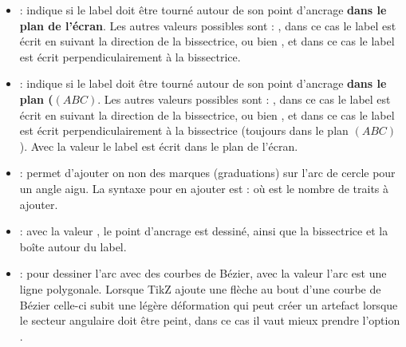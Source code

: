 \begin{itemize}
    \item {} : indique si le label doit être tourné autour de son point d'ancrage \textbf{dans le plan de l'écran}. Les autres valeurs possibles sont : , dans ce cas le label est écrit en suivant la direction de la bissectrice, ou bien , et dans ce cas le label est écrit perpendiculairement à la bissectrice.
    
    \item {} : indique si le label doit être tourné autour de son point d'ancrage \textbf{dans le plan ($(ABC)$}. Les autres valeurs possibles sont : , dans ce cas le label est écrit en suivant la direction de la bissectrice, ou bien , et dans ce cas le label est écrit perpendiculairement à la bissectrice (toujours dans le plan $(ABC)$). Avec la valeur  le label est écrit dans le plan de l'écran.
    
    \item {} : permet d'ajouter on non des marques (graduations) sur l'arc de cercle pour un angle aigu. La syntaxe pour en ajouter est :  où  est le nombre de traits à ajouter.
    
    \item {} : avec la valeur \true, le point d'ancrage est dessiné,  ainsi que la bissectrice et la boîte autour du label.
    
    \item {} : pour dessiner l'arc avec des courbes de Bézier, avec la valeur \false l'arc est une ligne polygonale. Lorsque TikZ ajoute une flèche au bout d'une courbe de Bézier celle-ci subit une légère déformation qui peut créer un artefact lorsque le secteur angulaire doit être peint, dans ce cas il vaut mieux prendre l'option .
\end{itemize}

